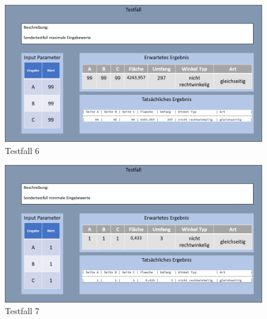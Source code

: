 \begin{figure}
    \centering
    \includegraphics[width=\linewidth]{images/Testfall6.png}
    \caption{Testfall 6}
\end{figure}
\begin{figure}

    \centering
    \includegraphics[width=\linewidth]{images/Testfall7.png}
    \caption{Testfall 7}
\end{figure}